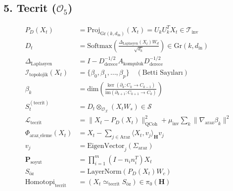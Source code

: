 \documentclass[11pt, a4paper]{article}
\begin{document}
\subsection{5. Tecrit ($\mathcal{O}_5$)}
\begin{align}
P_D(X_t) &= \text{Proj}_{\text{Gr}(k,d_{\text{in}})}(X_t) = U_k U_k^T X_t \in \mathcal{T}_{\text{inv}} \\
D_t &= \text{Softmax}\left( \frac{\Delta_{\text{Laplasyen}}(X_t) W_d}{\sqrt{d_k}} \right) \in \text{Gr}(k, d_{\text{in}}) \\
\Delta_{\text{Laplasyen}} &= I - D_{\text{derece}}^{-1/2} A_{\text{komşuluk}} D_{\text{derece}}^{-1/2} \\
\mathcal{I}_{\text{topolojik}}(X_t) &= \{ \beta_0, \beta_1, \dots, \beta_p \} \quad (\text{Betti Sayıları}) \\
\beta_k &= \text{dim}\left( \frac{\ker(\partial_k : C_k \to C_{k-1})}{\text{im}(\partial_{k+1} : C_{k+1} \to C_k)} \right) \\
S_t^{(\text{tecrit})} &= D_t \otimes_{\mathcal{O}_{\mathcal{X}}} (X_t W_s) \in \mathcal{S} \\
\mathcal{L}_{\text{tecrit}} &= \| X_t - P_D(X_t) \|_{\text{QCoh}}^2 + \mu_{\text{inv}} \sum_k \|\nabla_{\text{araz}} \beta_k\|^2 \\
\Phi_{\text{araz\_eleme}}(X_t) &= X_t - \sum_{j \in \text{Araz}} \langle X_t, v_j \rangle_{\mathbf{H}} v_j \\
v_j &= \text{EigenVector}_j(\Sigma_{\text{araz}}) \\
\mathbf{P}_{\text{soyut}} &= \prod_{i=1}^m (I - n_i n_i^T) X_t \\
S_{\text{öz}} &= \text{LayerNorm}(P_D(X_t) W_c) \\
\text{Homotopi}_{\text{tecrit}} &= (X_t \simeq_{\text{tecrit}} S_{\text{öz}}) \in \pi_0(\mathbf{H})
\end{align}
\end{document}
